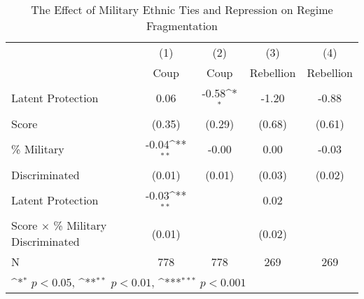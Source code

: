 \begin{table}[htbp]\centering
\def\sym#1{\ifmmode^{#1}\else\(^{#1}\)\fi}
\caption{\label{tab2} The Effect of Military Ethnic Ties and Repression on Regime Fragmentation}
\begin{tabular}{l*{4}{c}}
\hline\hline
                    &\multicolumn{1}{c}{(1)}         &\multicolumn{1}{c}{(2)}         &\multicolumn{1}{c}{(3)}         &\multicolumn{1}{c}{(4)}         \\
                    &        Coup         &        Coup         &   Rebellion         &   Rebellion         \\
\hline
Latent Protection   &        0.06         &       -0.58\sym{*}  &       -1.20         &       -0.88         \\
Score               &      (0.35)         &      (0.29)         &      (0.68)         &      (0.61)         \\
\% Military         &       -0.04\sym{**} &       -0.00         &        0.00         &       -0.03         \\
Discriminated       &      (0.01)         &      (0.01)         &      (0.03)         &      (0.02)         \\
Latent Protection   &       -0.03\sym{**} &                     &        0.02         &                     \\
Score $\times$ \% Military Discriminated&      (0.01)         &                     &      (0.02)         &                     \\
\hline
N                   &         778         &         778         &         269         &         269         \\
\hline\hline
\multicolumn{5}{l}{\footnotesize \sym{*} \(p<0.05\), \sym{**} \(p<0.01\), \sym{***} \(p<0.001\)}\\
\end{tabular}
\end{table}
